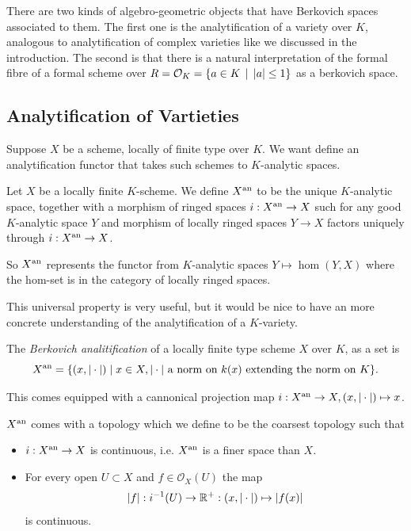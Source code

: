 There are two kinds of algebro-geometric objects that have Berkovich spaces associated to them. 
The first one is the analytification of a variety over $K$, analogous to analytification of complex varieties like we discussed in the introduction. 
The second is that there is a natural interpretation of the formal fibre of a formal scheme over $R = \mathcal{O}_K = \{a \in K \st |a| \le 1\} $ as a berkovich space. 


\subsection{Analytification of Vartieties} \label{sec:analytfication_of_vartieties}


Suppose $X$ be a scheme, locally of finite type over $K$.  We want define an analytification functor that takes such schemes to $K$-analytic spaces.  
\begin{definition}
	Let  $X$ be a locally finite $K$-scheme. 
	We define $X{}^{\text{an}}$ to be the unique $K$-analytic space, together with a morphism of ringed spaces $i: X{}^{\text{an}} \to X$ such for any good $K$-analytic space $Y$ and morphism of locally ringed spaces $Y \to X$ factors uniquely through $i: X{}^{\text{an}} \to X$. 
\end{definition}
So $X{}^{\text{an}}$ represents the functor from $K$-analytic spaces $Y \mapsto \hom(Y, X)$ where the hom-set is in the category of locally ringed spaces. 

This universal property is very useful, but it would be nice to have an more concrete understanding of the analytification of a $K$-variety. 
\begin{definition}\label{def:berkovich_analytification_explicit}
	The \emph{Berkovich analitification} of a locally finite type scheme $X$ over  $K$, as a set is \[
		X{}^{\text{an}} = \{(x, |\cdot |)  \mid x\in X, |\cdot | \text{ a norm on } k(x) \text{ extending the norm on }K \} 
	.\] 

	This comes equipped with a cannonical projection map $i: X{}^{\text{an}} \to X, (x, |\cdot |) \mapsto  x$.
	
	$X{}^{\text{an}} $ comes with a topology which we define to be the coarsest topology such that 
	\begin{itemize}
		\item $i: X{}^{\text{an}} \to X$ is continuous, i.e. $X{}^{\text{an}}$ is a finer space than  $X$. 
		\item For every open $U \subset X$ and $f \in \mathcal{O}_X(U)$ the map  \[
				|f|: i^{-1}(U) \to \mathbb{R}^{+}: (x, |\cdot |) \mapsto  |f(x)|
		\] 
		is continuous.
	\end{itemize}

\end{definition}

